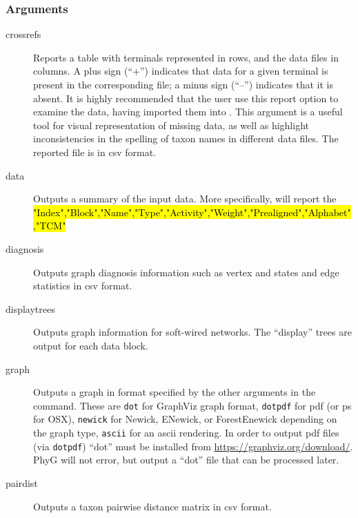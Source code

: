 	\subsubsection{Arguments}
	\begin{description}
		
		\item[crossrefs] Reports a table with terminals represented in rows, and the data files in 
		columns. A plus sign (``+'') indicates that data for a given terminal is present in the 
		corresponding file; a minus sign (``--'') indicates that it is absent. It is highly recommended 
		that the user use this report option to examine the data, having imported them into \phyg. 
		This argument is a useful tool for visual representation of missing data, as well as highlight 
		inconsistencies in the spelling of taxon names in different data files. The reported file is 
		in csv format.
			
		\item[data] Outputs a summary of the input data. More specifically, \phyg will report the 
		\hl{"Index","Block","Name","Type","Activity","Weight","Prealigned","Alphabet","TCM"}
	
		\item[diagnosis] Outputs graph diagnosis information such as vertex and states and edge 
		statistics in csv format. 
		
		\item[displaytrees] Outputs graph information for soft-wired networks. The ``display'' trees 
		are output for each data block. 
		
		\item[graph] Outputs a graph in format specified by the other arguments in the command. 
		These are \texttt{dot} for 
		GraphViz graph format, \texttt{dotpdf} for pdf (or ps for OSX), \texttt{newick} for Newick, 
		ENewick, or ForestEnewick depending on the graph type, \texttt{ascii} for an ascii rendering. 
		In order to output pdf files (via \texttt{dotpdf}) ``dot'' must be installed from 
		\url{https://graphviz.org/download/}. PhyG will not error, but output a ``dot'' file that 
		can be processed later.
		
		\item[pairdist] Outputs a taxon pairwise distance matrix in csv format. 
		

\end{description}
